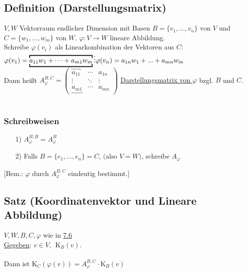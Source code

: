 \documentclass[a4paper, 12pt,titlepage, pdf, headsepline]{article}
\newcommand{\uline}[1]{\underline{#1}}
\renewcommand{\>}{\rightarrow}
\renewcommand{\*}{\cdot}
\renewcommand{\phi}{\varphi}
\begin{document}
		      				\subsection{Definition (Darstellungsmatrix)}
		      				\label{7.6}
		      				$V,W$ Vektorraum endlicher Dimension mit Basen $B = \{v_1,...,v_n\}$ von $V$ und $C = \{w_1,...,w_m\}$ von $W$. $\phi: V \rightarrow W$ lineare Abbildung.\\
		      				Schreibe $\phi(v_i)$ als Linearkombination der Vektoren aus $C$:\\
		      				$\phi(v_1) = \overbracket{\underbracket{a_{11}w_1 + \cdots + a_{m1} w_m}} \\
		      				\vdots \\
		      				\phi(v_n) = a_{1n} w_1 + ... + a_{mn} w_m$\\
		      				Dann heißt $A_\phi^{B,C} = \begin{pmatrix}
		      				\overbracket{a_{11}} & \cdots & a_{1n} \\
		      				\vdots & \ddots & \vdots \\
		      				\underbracket{a_{m1}} & \cdots & a_{mn}
		      				\end{pmatrix}$ \uline{Darstellungsmatrix von $\phi$} bzgl. $B$ und $C$.\\
		      				\\
		      				\subsubsection*{Schreibweisen}
		      				\begin{itemize}
		      					\item[1)] $A_\phi^{B,B} = A_\phi^B$
		      					\item[2)] Falls $B = \{e_1,...,e_n\} = C \textrm{, (also }V = W)$, schreibe $A_\phi$
		      				\end{itemize}
		      				$\Bigg[$Bem.: $\phi$ durch $A_\phi^{B,C}$ eindeutig bestimmt.$\Bigg]$
		      				\subsection{Satz (Koordinatenvektor und Lineare Abbildung)}
		      				\label{7.7}
		      				$V,W,B,C,\phi$ wie in \hyperref[7.6]{7.6}\\
		      				\uline{Gegeben}: $v \in V,~~ \text{K}_B(v)$.\\
		      				\\
		      				Dann ist K$_C(\phi(v)) = A_\phi^{B,C} \cdot \text{K}_B(v)$
\end{document}
